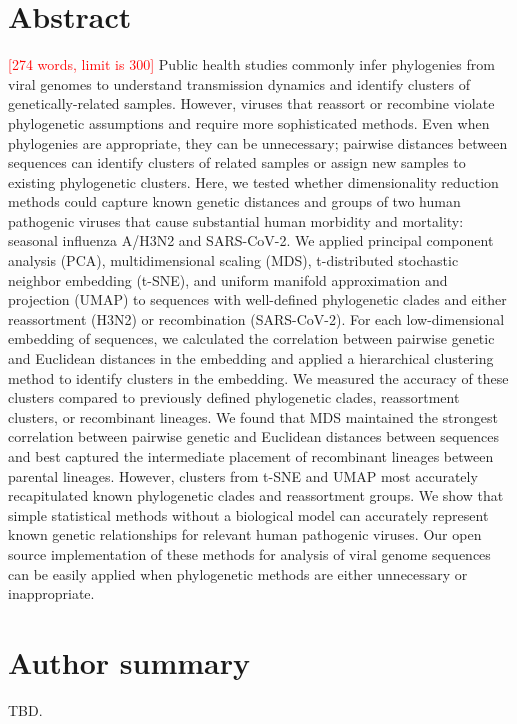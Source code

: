 \documentclass[10pt,letterpaper]{article}
\def\jhc#1{\textcolor{red}{[#1]}}
\begin{document}
\section*{Abstract}
\jhc{274 words, limit is 300}
Public health studies commonly infer phylogenies from viral genomes to understand transmission dynamics and identify clusters of genetically-related samples.
However, viruses that reassort or recombine violate phylogenetic assumptions and require more sophisticated methods.
Even when phylogenies are appropriate, they can be unnecessary; pairwise distances between sequences can identify clusters of related samples or assign new samples to existing phylogenetic clusters.
Here, we tested whether dimensionality reduction methods could capture known genetic distances and groups of two human pathogenic viruses that cause substantial human morbidity and mortality: seasonal influenza A/H3N2 and SARS-CoV-2.
We applied principal component analysis (PCA), multidimensional scaling (MDS), t-distributed stochastic neighbor embedding (t-SNE), and uniform manifold approximation and projection (UMAP) to sequences with well-defined phylogenetic clades and either reassortment (H3N2) or recombination (SARS-CoV-2).
For each low-dimensional embedding of sequences, we calculated the correlation between pairwise genetic and Euclidean distances in the embedding and applied a hierarchical clustering method to identify clusters in the embedding.
We measured the accuracy of these clusters compared to previously defined phylogenetic clades, reassortment clusters, or recombinant lineages.
We found that MDS maintained the strongest correlation between pairwise genetic and Euclidean distances between sequences and best captured the intermediate placement of recombinant lineages between parental lineages.
However, clusters from t-SNE and UMAP most accurately recapitulated known phylogenetic clades and reassortment groups.
We show that simple statistical methods without a biological model can accurately represent known genetic relationships for relevant human pathogenic viruses.
Our open source implementation of these methods for analysis of viral genome sequences can be easily applied when phylogenetic methods are either unnecessary or inappropriate.

\section*{Author summary}
TBD.
\end{document}
